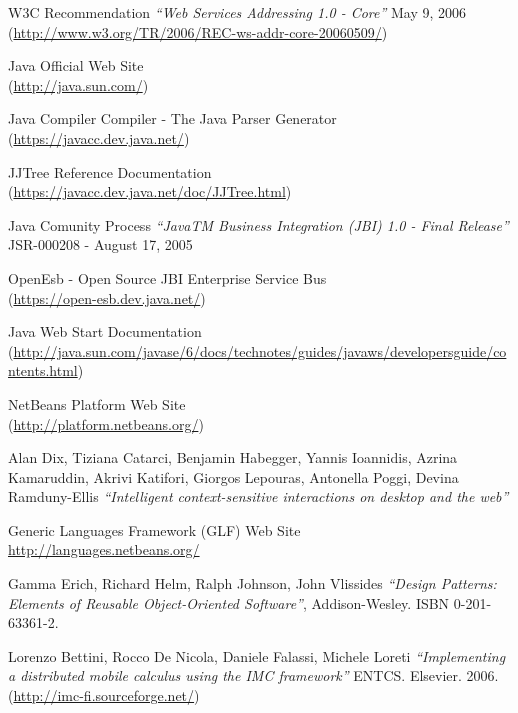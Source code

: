 \begin{thebibliography}{99}
  W3C Recommendation \emph{``Web Services Addressing 1.0
- Core''} May 9, 2006 \\
(\href{http://www.w3.org/TR/2006/REC-ws-addr-core-20060509/}{http://www.w3.org/TR/2006/REC-ws-addr-core-20060509/})

 Java Official Web Site \\ 
(\href{http://java.sun.com/}{http://java.sun.com/})

 Java Compiler Compiler - The Java Parser
Generator \\ (\href{https://javacc.dev.java.net/}{https://javacc.dev.java.net/})

 JJTree Reference Documentation\\
(\href{https://javacc.dev.java.net/doc/JJTree.html}{https://javacc.dev.java.net/doc/JJTree.html})

 Java Comunity Process \emph{``JavaTM Business Integration (JBI)
1.0 - Final Release''} JSR-000208 - August 17, 2005

 OpenEsb - Open Source JBI Enterprise Service Bus \\
(\href{https://open-esb.dev.java.net/}{https://open-esb.dev.java.net/})

 Java Web Start Documentation \\
(\href{http://java.sun.com/javase/6/docs/technotes/guides/javaws/developersguide/contents.html}{http://java.sun.com/javase/6/docs/technotes/guides/javaws/developersguide/contents.html})

 NetBeans Platform Web Site \\
(\href{http://platform.netbeans.org/}{http://platform.netbeans.org/})

 Alan Dix, Tiziana Catarci, Benjamin Habegger,
Yannis Ioannidis, Azrina Kamaruddin, Akrivi Katifori, Giorgos Lepouras, Antonella Poggi, Devina Ramduny-Ellis
\emph{``Intelligent context-sensitive interactions on desktop and the web''}

 Generic Languages Framework (GLF) Web Site \\
\href{http://languages.netbeans.org/}{http://languages.netbeans.org/}

 Gamma Erich, Richard Helm, Ralph Johnson, John Vlissides
\emph{``Design Patterns: Elements of Reusable Object-Oriented Software''},
Addison-Wesley. ISBN 0-201-63361-2.

 Lorenzo Bettini, Rocco De Nicola, Daniele Falassi, Michele Loreti
\emph{``Implementing a distributed mobile calculus using the IMC framework''}
ENTCS. Elsevier. 2006.\\
(\href{http://imc-fi.sourceforge.net/}{http://imc-fi.sourceforge.net/})


\end{thebibliography}
